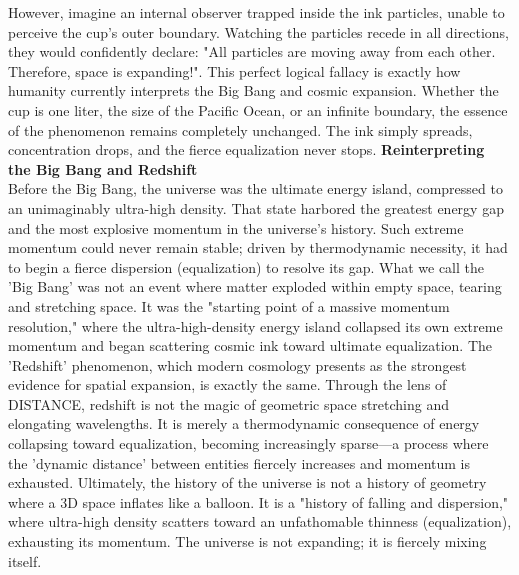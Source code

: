 However, imagine an internal observer trapped inside the ink particles, unable to perceive the cup's outer boundary. Watching the particles recede in all directions, they would confidently declare: "All particles are moving away from each other. Therefore, space is expanding!".
This perfect logical fallacy is exactly how humanity currently interprets the Big Bang and cosmic expansion. Whether the cup is one liter, the size of the Pacific Ocean, or an infinite boundary, the essence of the phenomenon remains completely unchanged. The ink simply spreads, concentration drops, and the fierce equalization never stops.
\textbf{Reinterpreting the Big Bang and Redshift} \\
Before the Big Bang, the universe was the ultimate energy island, compressed to an unimaginably ultra-high density. That state harbored the greatest energy gap and the most explosive momentum in the universe's history. Such extreme momentum could never remain stable; driven by thermodynamic necessity, it had to begin a fierce dispersion (equalization) to resolve its gap.
What we call the 'Big Bang' was not an event where matter exploded within empty space, tearing and stretching space. It was the "starting point of a massive momentum resolution," where the ultra-high-density energy island collapsed its own extreme momentum and began scattering cosmic ink toward ultimate equalization.
The 'Redshift' phenomenon, which modern cosmology presents as the strongest evidence for spatial expansion, is exactly the same. Through the lens of DISTANCE, redshift is not the magic of geometric space stretching and elongating wavelengths. It is merely a thermodynamic consequence of energy collapsing toward equalization, becoming increasingly sparse—a process where the 'dynamic distance' between entities fiercely increases and momentum is exhausted.
Ultimately, the history of the universe is not a history of geometry where a 3D space inflates like a balloon. It is a "history of falling and dispersion," where ultra-high density scatters toward an unfathomable thinness (equalization), exhausting its momentum. The universe is not expanding; it is fiercely mixing itself.